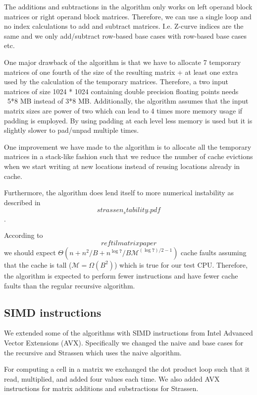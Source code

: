 The additions and subtractions in the algorithm only works on left operand block matrices or right operand block matrices. Therefore, we can use a single loop and no index calculations to add and subtract matrices. I.e. Z-curve indices are the same and we only add/subtract row-based base cases with row-based base cases etc.

One major drawback of the algorithm is that we have to allocate 7 temporary matrices of one fourth of the size of the resulting matrix + at least one extra used by the calculation of the temporary matrices. Therefore, a two input matrices of size 1024 * 1024 containing double precision floating points needs ~5*8 MB instead of 3*8 MB. Additionally, the algorithm assumes that the input matrix sizes are power of two which can lead to 4 times more memory usage if padding is employed. By using padding at each level less memory is used but it is slightly slower to pad/unpad multiple times.

One improvement we have made to the algorithm is to allocate all the temporary matrices in a stack-like fashion such that we reduce the number of cache evictions when we start writing at new locations instead of reusing locations already in cache.

Furthermore, the algorithm does lend itself to more numerical instability as described in \[strassen_stability.pdf\].

According to \[ ref til matrix paper \] we should expect $\Theta(n+n^2/B + n^{\log 7}/B\mathcal{M}^{(\log 7)/2-1})$ cache faults assuming that the cache is tall ($\mathcal{M} = \Omega(B^2)$) which is true for our test CPU. Therefore, the algorithm is expected to perform fewer instructions and have fewer cache faults than the regular recursive algorithm.

\subsection{SIMD instructions}

We extended some of the algorithms with SIMD instructions from Intel Advanced Vector Extensions (AVX). Specifically we changed the naive and base cases for the recursive and Strassen which uses the naive algorithm.

For computing a cell in a matrix we exchanged the dot product loop such that it read, multiplied, and added four values each time. We also added AVX instructions for matrix additions and substractions for Strassen.

